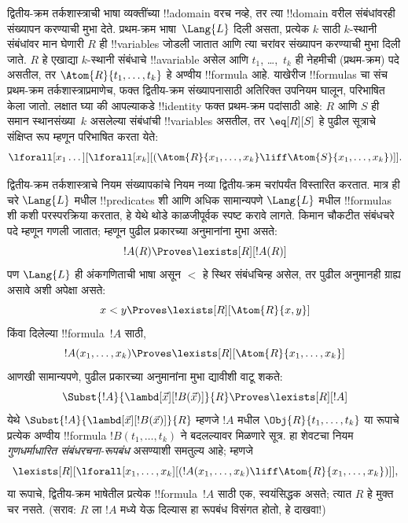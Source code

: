 \documentclass[../../../include/open-logic-section]{subfiles}
\begin{document}


द्वितीय-क्रम तर्कशास्त्राची भाषा व्यक्तींच्या !!a{domain} वरच नव्हे, तर त्या
!!{domain} वरील संबंधांवरही संख्यापन करण्याची मुभा देते. प्रथम-क्रम
भाषा~$\Lang{L}$ दिली असता, प्रत्येक $k$ साठी $k$-स्थानी संबंधांवर मान घेणारी
$R$ ही !!{variable}s जोडली जातात आणि त्या चरांवर संख्यापन करण्याची मुभा दिली
जाते. $R$ हे एखाद्या $k$-स्थानी संबंधाचे !!a{variable} असेल आणि $t_1$,
\dots,~$t_k$ ही नेहमीची (प्रथम-क्रम) पदे असतील, तर
$\Atom{R}{t_1,\dots,t_k}$ हे अण्वीय !!{formula} आहे. याखेरीज !!{formula}s चा
संच प्रथम-क्रम तर्कशास्त्राप्रमाणेच, फक्त द्वितीय-क्रम संख्यापनासाठी अतिरिक्त
उपनियम घालून, परिभाषित केला जातो. लक्षात घ्या की आपल्याकडे !!{identity} फक्त
प्रथम-क्रम पदांसाठी आहे: $R$ आणि $S$ ही समान स्थानसंख्या~$k$ असलेल्या
संबंधांची !!{variable}s असतील, तर $\eq[R][S]$ हे पुढील सूत्राचे संक्षिप्त रूप
म्हणून परिभाषित करता येते:
\[
\lforall[x_1 \dots][\lforall[x_k][(\Atom{R}{x_1, \dots, x_k} \liff
  \Atom{S}{x_1, \dots, x_k})]].
\]

द्वितीय-क्रम तर्कशास्त्राचे नियम संख्यापकांचे नियम नव्या द्वितीय-क्रम चरांपर्यंत
विस्तारित करतात. मात्र ही चरे $\Lang{L}$ मधील !!{predicate}s शी आणि अधिक
सामान्यपणे $\Lang{L}$ मधील !!{formula}s शी कशी परस्परक्रिया करतात, हे येथे
थोडे काळजीपूर्वक स्पष्ट करावे लागते. किमान चौकटीत संबंधचरे पदे म्हणून गणली
जातात; म्हणून पुढील प्रकारच्या अनुमानांना मुभा असते:
\[
!A(R) \Proves \lexists[R][!A(R)]
\]
पण $\Lang{L}$ ही अंकगणिताची भाषा असून $<$ हे स्थिर संबंधचिन्ह असेल, तर पुढील
अनुमानही ग्राह्य असावे अशी अपेक्षा असते:
\[
x < y \Proves \lexists[R][\Atom{R}{x,y}]
\]
किंवा दिलेल्या !!{formula}~$!A$ साठी,
\[
!A(x_1, \dots, x_k) \Proves \lexists[R][\Atom{R}{x_1,\dots,x_k}]
\]
आणखी सामान्यपणे, पुढील प्रकारच्या अनुमानांना मुभा द्यावीशी वाटू शकते:
\[
\Subst{!A}{\lambd[\vec x][!B(\vec x)]}{R} \Proves
\lexists[R][!A]
\]
येथे $\Subst{!A}{\lambd[\vec x][!B(\vec x)]}{R}$ म्हणजे $!A$ मधील
$\Obj{R}{t_1,\dots,t_k}$ या रूपाचे प्रत्येक अण्वीय !!{formula}
$!B(t_1, \dots, t_k)$ ने बदलल्यावर मिळणारे सूत्र. हा शेवटचा नियम
{\em गुणधर्माधारित संबंधरचना-रूपबंध} असण्याशी समतुल्य आहे; म्हणजे
\[
\lexists[R][\lforall[x_1, \dots, x_k][(!A(x_1, \dots, x_k) \liff
\Atom{R}{x_1, \dots, x_k})]],
\]
या रूपाचे, द्वितीय-क्रम भाषेतील प्रत्येक !!{formula}~$!A$ साठी एक,
स्वयंसिद्धक असते; त्यात $R$ हे मुक्त चर नसते. (सराव: $R$ ला $!A$ मध्ये येऊ
दिल्यास हा रूपबंध विसंगत होतो, हे दाखवा!)
\end{document}
